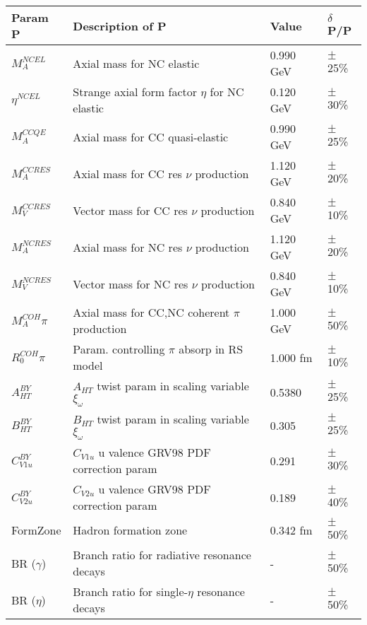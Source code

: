 \begin{table*}
\centering
{}
\begin{tabular}{| l | l | l | l |}
\hline
   Param P & Description of P & Value  & $\delta$P/P \\ [0.1ex] \hline
 $M_A^{NCEL}$  & Axial mass for NC elastic & 0.990 GeV & $\pm$25\% \\
 $\eta^{NCEL}$  & Strange axial form factor $\eta$ for NC elastic & 0.120 GeV & $\pm$30\% \\
$M_A^{CCQE}$  & Axial mass for CC quasi-elastic & 0.990 GeV & $\pm$25\% \\
$M_A^{CCRES}$  & Axial mass for CC res $\nu$ production & 1.120 GeV & $\pm$20\% \\
$M_V^{CCRES}$  & Vector mass for CC res $\nu$ production & 0.840 GeV & $\pm$10\% \\
$M_A^{NCRES}$  & Axial mass for NC res $\nu$ production & 1.120 GeV & $\pm$20\% \\
$M_V^{NCRES}$  & Vector mass for NC res $\nu$ production & 0.840 GeV & $\pm$10\% \\
$M_A^{COH}\pi$  & Axial mass for CC,NC coherent $\pi$ production & 1.000 GeV & $\pm$50\% \\
$R_0^{COH}\pi$  & Param. controlling $\pi$ absorp in RS model & 1.000 fm & $\pm$10\% \\ \hline

$A_{HT}^{BY}$  & $A_{HT}$ twist param in scaling variable $\xi_\omega$ & 0.5380 & $\pm$25\% \\
$B_{HT}^{BY}$  & $B_{HT}$ twist param in scaling variable $\xi_\omega$ & 0.305 & $\pm$25\% \\
$C_{V1u}^{BY}$  & $C_{V1u}$ u valence GRV98 PDF correction param & 0.291 & $\pm$30\% \\
$C_{V2u}^{BY}$  & $C_{V2u}$ u valence GRV98 PDF correction param & 0.189 & $\pm$40\% \\ \hline

FormZone  & Hadron formation zone & 0.342 fm & $\pm$50\% \\
BR ($\gamma$)  & Branch ratio for radiative resonance decays & - & $\pm$50\% \\
BR ($\eta$)  & Branch ratio for single-$\eta$ resonance decays & - & $\pm$50\% \\ \hline


\end{tabular}
\end{table*}
